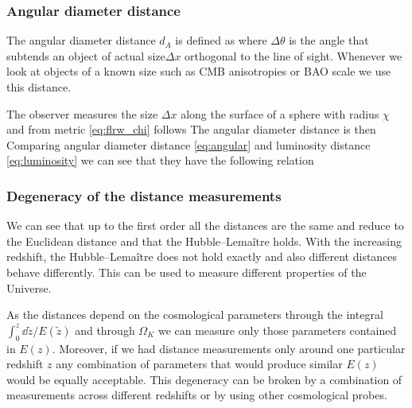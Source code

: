 \subsubsection{Angular diameter distance}
The angular diameter distance $d_A$ is defined as
where $\Delta\theta$ is the angle that subtends an object of actual size$\Delta x$ orthogonal to the line of sight. Whenever we look at objects of a known size such as CMB anisotropies or BAO scale we use this distance.

The observer measures the size $\Delta x$ along the surface of a sphere with radius $\chi$ and from metric \eqref{eq:flrw_chi} follows
The angular diameter distance is then
Comparing angular diameter distance \eqref{eq:angular} and luminosity distance \eqref{eq:luminosity} we can see that they have the following relation
\subsubsection{Degeneracy of the distance measurements}
We can see that up to the first order all the distances are the same and reduce to the Euclidean distance and that the Hubble--Lema\^{i}tre holds. With the increasing redshift, the Hubble--Lema\^{i}tre does not hold exactly and also different distances behave differently. This can be used to measure different properties of the Universe.

As the distances depend on the cosmological parameters through the integral $\int_0^z{\dd\tilde z/E(\tilde z)}$ and through $\Omega_K$ we can measure only those parameters contained in $E(z)$. Moreover, if we had distance measurements only around one particular redshift $z$ any combination of parameters that would produce similar $E(z)$ would be equally acceptable. This degeneracy can be broken by a combination of measurements across different redshifts or by using other cosmological probes.